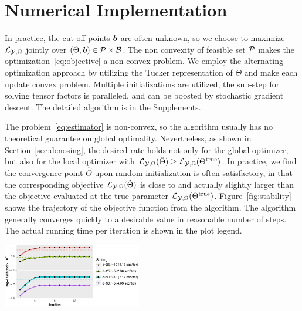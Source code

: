 \documentclass{article}
\theoremstyle{plain}
\theoremstyle{definition}
\begin{document}
\vspace{-.3cm}
\section{Numerical Implementation}\label{sec:algorithm}
\vspace{-.2cm}
 In practice, the cut-off points $\bm{b}$ are often unknown, so we choose to maximize $\mathcal{L}_{\mathcal{Y},\Omega}$ jointly over $(\Theta,\bm{b})\in\mathcal{P}\times \mathcal{B}$. The non convexity of feasible set $\mathcal{P}$  makes the optimization~\eqref{eq:objective} a non-convex problem. We employ the alternating optimization approach by utilizing the Tucker representation of $\Theta$ and make each update convex problem. Multiple initializations are utilized, the sub-step for solving tensor factors is paralleled, and can be boosted by stochastic gradient descent. The detailed algorithm is in the Supplements.

The problem~\eqref{eq:estimator} is non-convex, so the algorithm usually has no theoretical guarantee on global optimality. Nevertheless, as shown in Section~\ref{sec:denosing}, the desired rate holds not only for the global optimizer, but also for the local optimizer with $\mathcal{L}_{\mathcal{Y},\Omega}(\hat \Theta)\geq \mathcal{L}_{\mathcal{Y},\Omega}(\Theta^{\text{true}})$. In practice, we find the convergence point $\hat \Theta$ upon random initialization is often satisfactory, in that the corresponding objective $\mathcal{L}_{\mathcal{Y},\Omega}(\hat \Theta)$ is close to and actually slightly larger than the objective evaluated at the true parameter $\mathcal{L}_{\mathcal{Y},\Omega}(\Theta^{\text{true}})$. Figure~\ref{fig:stability} shows the trajectory of the objective function from the algorithm. The algorithm generally converges quickly to a desirable value in reasonable number of steps. The actual running time per iteration is shown in the plot legend.

\begin{minipage}{0.58\textwidth}
\centering
\includegraphics[width=6cm]{algorithm.pdf}\label{fig:stability}
\end{minipage}
\begin{minipage}{0.4\textwidth}
\end{minipage}
\end{document}
